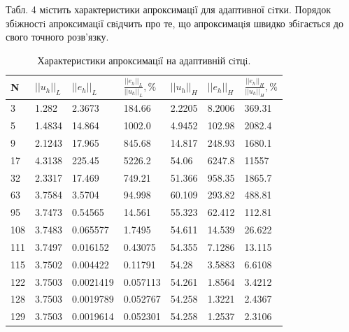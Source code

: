 \documentclass[a4paper]{article}
\numberwithin{equation}{section}
\begin{document}
Табл. 4 мiстить характеристики апроксимацiї для адаптивної сiтки. Порядок збiжностi апроксимацiї свiдчить про те, що апроксимацiя швидко збiгається до свого точного розв’язку.
\begin{table}[H]
\centering
\begin{tabular}{|l|l|l|l|l|l|l|}
\hline
N   & $||u_h||_L$ & $||e_h||_L$ & $\frac{||e_h||_L}{||u_h||_L}, \%$ & $||u_h||_H$ & $||e_h||_H$ & $\frac{||e_h||_H}{||u_h||_H}, \%$ \\ \hline
3   & 1.282       & 2.3673      & 184.66                            & 2.2205      & 8.2006      & 369.31                            \\ \hline
5   & 1.4834      & 14.864      & 1002.0                            & 4.9452      & 102.98      & 2082.4                            \\ \hline
9   & 2.1243      & 17.965      & 845.68                            & 14.817      & 248.93      & 1680.1                            \\ \hline
17  & 4.3138      & 225.45      & 5226.2                            & 54.06       & 6247.8      & 11557                             \\ \hline
32  & 2.3317      & 17.469      & 749.21                            & 51.366      & 958.35      & 1865.7                            \\ \hline
63  & 3.7584      & 3.5704      & 94.998                            & 60.109      & 293.82      & 488.81                            \\ \hline
95  & 3.7473      & 0.54565     & 14.561                            & 55.323      & 62.412      & 112.81                            \\ \hline
108 & 3.7483      & 0.065577    & 1.7495                            & 54.611      & 14.539      & 26.622                            \\ \hline
111 & 3.7497      & 0.016152    & 0.43075                           & 54.355      & 7.1286      & 13.115                            \\ \hline
115 & 3.7502      & 0.004422    & 0.11791                           & 54.28       & 3.5883      & 6.6108                            \\ \hline
122 & 3.7503      & 0.0021419   & 0.057113                          & 54.261      & 1.8564      & 3.4212                            \\ \hline
128 & 3.7503      & 0.0019789   & 0.052767                          & 54.258      & 1.3221      & 2.4367                            \\ \hline
129 & 3.7503      & 0.0019614   & 0.052301                          & 54.258      & 1.2537      & 2.3106                             \\ \hline
\end{tabular}
\caption{Характеристики апроксимацiї на адаптивній сiтцi.}
\end{table}
\end{document}
